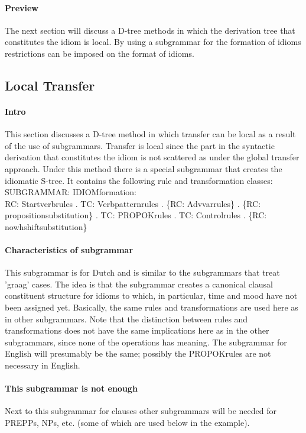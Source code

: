 \paragraph{Preview}
The next section will discuss a D-tree methods in which the derivation tree
that constitutes the idiom is local. By using a subgrammar for the formation 
of idioms restrictions can be imposed on the format of idioms.

\subsection {Local Transfer}
\label{ST2}

\paragraph{Intro}
This section discusses a D-tree method in which transfer can be local as a
result of the use of subgrammars. Transfer is local since the part in the
syntactic derivation that constitutes the idiom is not scattered as under the
global transfer approach. Under this method there is a special subgrammar that
creates the idiomatic S-tree. It contains the following rule and transformation
classes:\\ 

SUBGRAMMAR: IDIOMformation:\\

RC: Startverbrules . TC: Verbpatternrules . \{RC: Advvarrules\} . \{RC:
propositionsubstitution\} . TC: PROPOKrules  .  TC: Controlrules .  \{RC:
nowhshiftsubstitution\} 

\paragraph{Characteristics of subgrammar}
This subgrammar is for Dutch and is similar to the subgrammars that treat
'graag' cases. The idea is that the subgrammar creates a canonical clausal
constituent structure for idioms to which, in particular, time and mood have
not been assigned yet. Basically, the same rules and transformations are used
here as in other subgrammars. Note that the distinction between rules and
transformations does not have the same implications here as in the other
subgrammars, since none of the operations has meaning. The subgrammar for
English will presumably be the same; possibly the PROPOKrules are not necessary
in English. 

\paragraph{This subgrammar is not enough}
Next to this subgrammar for clauses other subgrammars will be needed for
PREPPs, NPs, etc. (some of which are used below in the example).

